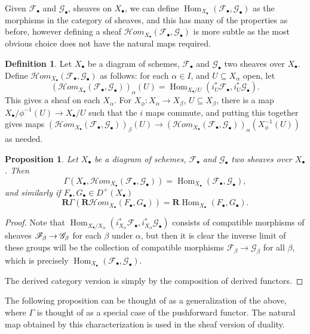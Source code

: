 \documentclass[proquest]{uwthesis}[2014/11/13]
\newtheorem{prop}[theorem]{Proposition}
\theoremstyle{definition}
\newtheorem{definition}[theorem]{Definition}
\DeclareMathOperator{\Hom}{Hom}
\newcommand{\cHom}{\mathcal{H} \textit{om}}
\newcommand{\FF}{\mathscr{F}}
\newcommand{\GG}{\mathscr{G}}
\newcommand{\bR}{\textbf{R}}
\begin{document}
Given $\FF_\bullet$ and $\GG_\bullet$, sheaves on $X_\bullet$, we can define $\Hom_{X_\bullet}(\FF_\bullet, \GG_\bullet)$ as the morphisms in the category of sheaves, and this has many of the properties as before, however defining a sheaf $\cHom_{X_\bullet}(\FF_\bullet, \GG_\bullet)$ is more subtle as the most obvious choice does not have the natural maps required.
\begin{definition}
	Let $X_\bullet$ be a diagram of schemes, $\FF_\bullet$ and $\GG_\bullet$ two sheaves over $X_\bullet$.
	Define $\cHom_{X_\bullet}(\FF_\bullet, \GG_\bullet)$ as follows: for each $\alpha \in I$, and $U \subseteq X_\alpha$ open, let
	\[
	(\cHom_{X_\bullet}(\FF_\bullet, \GG_\bullet))_\alpha(U) = \Hom_{X_\bullet/U} ( i_U^* \FF_\bullet , i_U^* \GG_\bullet).
	\]
	This gives a sheaf on each $X_\alpha$.
	For $X_\phi : X_\alpha \rightarrow X_\beta$, $U \subseteq X_\beta$, there is a map $X_\bullet / \phi^{-1}(U) \rightarrow X_\bullet / U$ such that the $i$ maps commute, and putting this together gives maps $(\cHom_{X_\bullet}(\FF_\bullet, \GG_\bullet))_\beta(U) \rightarrow (\cHom_{X_\bullet}(\FF_\bullet, \GG_\bullet))_\alpha(X_\phi^{-1}(U))$ as needed.
\end{definition}

\begin{prop}
	Let $X_\bullet$ be a diagram of schemes, $\FF_\bullet$ and $\GG_\bullet$ two sheaves over $X_\bullet$.
	Then
	\[
	\Gamma(X_\bullet, \cHom_{X_\bullet}(\FF_\bullet, \GG_\bullet)) = \Hom_{X_\bullet}(\FF_\bullet, \GG_\bullet),
	\]
	and similarly if $F_\bullet, G_\bullet \in D^+(X_\bullet)$
	\[
	\bR \Gamma (\bR \cHom_{X_\bullet}(F_\bullet, G_\bullet)) = \bR \Hom_{X_\bullet}(F_\bullet, G_\bullet).
	\]
\end{prop}
\begin{proof}
	Note that $ \Hom_{X_\bullet / X_\alpha} ( i_{X_\alpha}^* \FF_\bullet , i_{X_\alpha}^* \GG_\bullet)$ consists of compatible morphisms of sheaves $\FF_\beta \rightarrow\nobreak \GG_\beta$ for each $\beta$ under $\alpha$, but then it is clear the inverse limit of these groups will be the collection of compatible morphisms $\FF_\beta \rightarrow \GG_\beta$ for all $\beta$, which is precisely $\Hom_{X_\bullet}(\FF_\bullet, \GG_\bullet)$.
	
	The derived category version is simply by the composition of derived functors.
\end{proof}

The following proposition can be thought of as a generalization of the above, where $\Gamma$ is thought of as a special case of the pushforward functor. 
The natural map obtained by this characterization is used in the sheaf version of duality.
\end{document}

